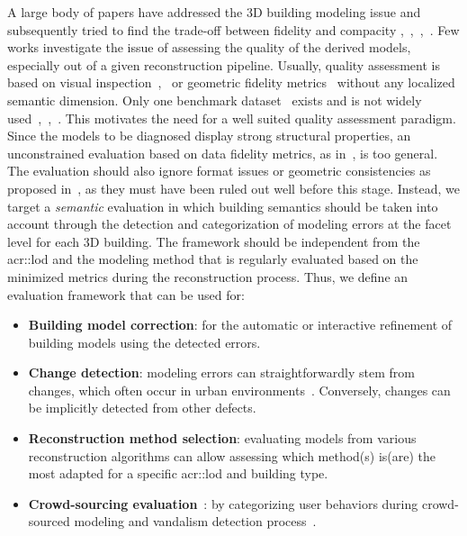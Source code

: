 \documentclass[runningheads]{llncs}
\begin{document}
A large body of papers have addressed the 3D building modeling issue and subsequently tried to find the trade-off between fidelity and compacity \cite{dick2004modelling},~\cite{zebedin2008fusion},~\cite{Lafarge2010},~\cite{verdie2015lod}. Few works investigate the issue of assessing the quality of the derived models, especially out of a given reconstruction pipeline. Usually, quality assessment is based on visual inspection~\cite{Durupt2006},~\cite{MacayMoreia2013} or geometric fidelity metrics~\cite{Kaartinen2005} without any localized semantic dimension. Only one benchmark dataset~\cite{rottensteiner2014results} exists and is not widely used~\cite{li2016boxfitting},~\cite{nan2017polyfit},~\cite{nguatem2017modeling}. This motivates the need for a well suited quality assessment paradigm. Since the models to be diagnosed display strong structural properties, an unconstrained evaluation based on data fidelity metrics, as in~\cite{berger2013benchmark}, is too general. The evaluation should also ignore format issues or geometric consistencies as proposed in~\cite{ledoux2018val3dity}, as they must have been ruled out well before this stage. Instead, we target a \textit{semantic} evaluation in which building semantics should be taken into account through the detection and categorization of modeling errors at the facet level for each 3D building. The framework should be independent from the \acrlong{acr::lod} and the modeling method that is regularly evaluated based on the minimized metrics during the reconstruction process. Thus, we define an evaluation framework that can be used for:
    \begin{itemize}
        \item \textbf{Building model correction}: for the automatic or interactive \cite{kowdle2011active} refinement of building models using the detected errors.
        \item \textbf{Change detection}: modeling errors can straightforwardly stem from changes, which often occur in urban environments~\cite{taneja2015geometric}. Conversely, changes can be implicitly detected from other defects.
        \item \textbf{Reconstruction method selection}: evaluating models from various reconstruction algorithms can allow assessing which method(s) is(are) the most adapted for a specific \acrshort{acr::lod} and building type.
        \item \textbf{Crowd-sourcing evaluation}~\cite{kovashka2016crowdsourcing}: by categorizing user behaviors during crowd-sourced modeling and vandalism detection process~\cite{neis2012towards}.
    \end{itemize}
\end{document}

